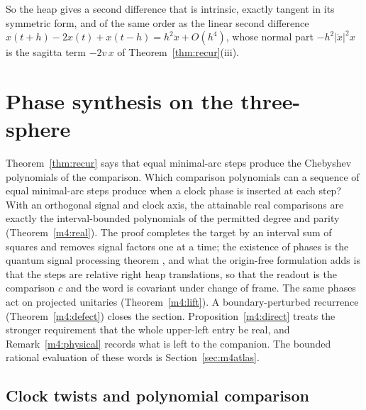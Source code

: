 \documentclass[11pt,reqno]{amsart}
\theoremstyle{definition}
\theoremstyle{remark}
\numberwithin{equation}{section}
\begin{document}
So the heap gives a second difference that is intrinsic, exactly tangent in its symmetric form, and of
the same order as the linear second difference $x(t+h)-2x(t)+x(t-h)=h^2\ddot x+O(h^4)$, whose normal part
$-h^2\lvert\dot x\rvert^2x$ is the sagitta term $-2v\,x$ of Theorem~\ref{thm:recur}(iii).

\setcounter{section}{0}
\renewcommand{\thesection}{6\Alph{section}}
\renewcommand{\theHsection}{arcB.\arabic{section}}
\section{Phase synthesis on the three-sphere}\label{sec:m4}

Theorem~\ref{thm:recur} says that equal minimal-arc steps produce the Chebyshev polynomials of the comparison. Which comparison
polynomials can a sequence of equal minimal-arc steps produce when a clock phase is inserted at each step? With an orthogonal signal
and clock axis, the attainable real comparisons are exactly the interval-bounded polynomials of the permitted degree and parity
(Theorem~\ref{m4:real}). The proof completes the target by an interval sum of squares and removes signal factors one at a time; the
existence of phases is the quantum signal processing theorem \cite{m4:GSLW,m4:Haah,m4:LC}, and what the origin-free formulation adds is
that the steps are relative right heap translations, so that the readout is the comparison $c$ and the word is covariant under change of
frame. The same phases act on projected unitaries (Theorem~\ref{m4:lift}). A boundary-perturbed recurrence (Theorem~\ref{m4:defect})
closes the section. Proposition~\ref{m4:direct} treats the stronger requirement that the whole upper-left entry be real, and
Remark~\ref{m4:physical} records what is left to the companion. The bounded rational evaluation of these words is
Section~\ref{sec:m4atlas}.

\subsection{Clock twists and polynomial comparison}
\end{document}
